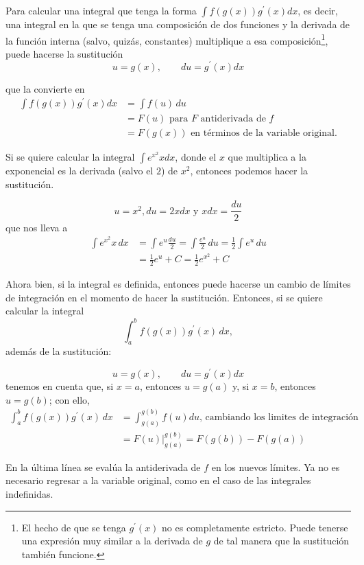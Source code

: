 Para calcular una integral que tenga la forma {\footnotesize $\displaystyle{\int f(g(x))g^{\prime}(x)dx}$}, es decir, una integral en la que se tenga una composición de dos funciones y la derivada de la función interna (salvo, quizás, constantes) multiplique a esa composición\footnote{El hecho de que se tenga $g^\prime(x)$ no es completamente estricto. Puede tenerse una expresión muy similar a la derivada de $g$ de tal manera que la sustitución también funcione.}, puede hacerse la sustitución
\[u=g(x), \qquad du=g^{\prime}(x)dx\]

que la convierte en
\begin{align*}
\int f(g(x))g^{\prime}(x)dx&=\int f(u)\, du\\
&=F(u)\text{\ para $F$ antiderivada de $f$}\\
&=F(g(x))\text{ en términos de la variable original.}
\end{align*}

\begin{ejemplo}
\textnormal{Si se quiere calcular la integral {\footnotesize \textit{$\displaystyle{\int e^{x^2}xdx}$}}, donde el $x$ que multiplica a la exponencial es la derivada (salvo el $2$) de \textit{$x^2$}, entonces podemos hacer la sustitución}.
\end{ejemplo}
\[
u=x^2, du=2xdx \text{ y } xdx=\frac{du}{2}
\]
que nos lleva a
\begin{align*}
\int e^{x^2}x\, dx&=\int e^{u}\frac{du}{2}=\int \frac{e^u}{2}\, du
=\frac{1}{2}\int e^u\, du\\
&=\frac{1}{2}e^u+C=\frac{1}{2}e^{x^2}+C
\end{align*}

Ahora bien, si la integral es definida, entonces puede hacerse un cambio de límites de integración en el momento de hacer la sustitución. Entonces, si se quiere calcular la integral
\[
\int_{a}^{b}f(g(x))g^{\prime}(x)\,dx,
\]
además de la sustitución:

\[
u=g(x),\qquad du=g^{\prime}(x)dx
\]
tenemos en cuenta que, si $x=a$, entonces $u=g\left( a\right)$ y, si $x=b$, entonces $u=g\left( b\right)$; con ello,
\begin{align*}
\int_{a}^{b}f(g(x))g^{\prime}(x)\,dx&=
\int_{g(a)}^{g(b)}f(u)du \text{, cambiando los limites de integración}\\
&=F(u)\Big\vert_{g(a)}^{g(b)}=F(g(b))-F(g(a))
\end{align*}


En la última línea se evalúa la antiderivada de $f$ en los nuevos límites. Ya no es necesario regresar a la variable original, como en el caso de las integrales indefinidas.



